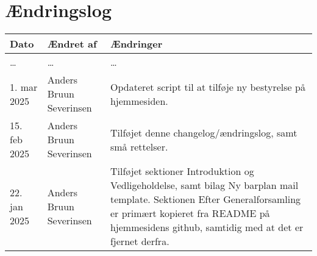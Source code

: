 \section{Ændringslog}
\label{sec:changelog}

\begin{tabular}{l l l}
    \textbf{Dato} & \textbf{Ændret af} & \textbf{Ændringer} \\
    \hline
    \begin{minipage}[t]
        {0.15\linewidth}
        \dots
    \end{minipage} &
    \begin{minipage}[t]
        {0.35\linewidth}
        \dots
    \end{minipage} & 
    \begin{minipage}[t]
        {0.5\linewidth}
        \dots
    \end{minipage} \\
    \hline
    \begin{minipage}[t]
        {0.15\linewidth}
        1. mar 2025
    \end{minipage} &
    \begin{minipage}[t]
        {0.35\linewidth}
        Anders Bruun Severinsen
    \end{minipage} & 
    \begin{minipage}[t]
        {0.5\linewidth}
        Opdateret script til at tilføje ny bestyrelse på hjemmesiden.
    \end{minipage} \\
    \hline
    \begin{minipage}[t]
        {0.15\linewidth}
        15. feb 2025
    \end{minipage} &
    \begin{minipage}[t]
        {0.35\linewidth}
        Anders Bruun Severinsen
    \end{minipage} & 
    \begin{minipage}[t]
        {0.5\linewidth}
        Tilføjet denne changelog/ændringslog, samt små rettelser.
    \end{minipage} \\
    \hline
    \begin{minipage}[t]
        {0.15\linewidth}
        22. jan 2025
    \end{minipage} &
    \begin{minipage}[t]
        {0.35\linewidth}
        Anders Bruun Severinsen
    \end{minipage} & 
    \begin{minipage}[t]
        {0.5\linewidth}
        Tilføjet sektioner Introduktion og Vedligeholdelse, samt bilag Ny barplan mail template.
        Sektionen Efter Generalforsamling er primært kopieret fra README på hjemmesidens 
        github, samtidig med at det er fjernet derfra.
    \end{minipage} \\
    \hline
\end{tabular}
